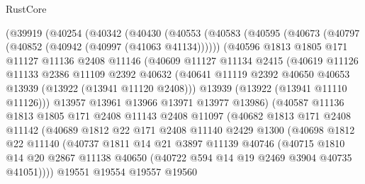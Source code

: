 \begin{lexlean}{RustCore}
\begin{coremodule}
    (@39919
      (@40254
        (@40342
          (@40430
            (@40553
              (@40583
                (@40595
                  (@40673 (@40797 (@40852 (@40942 (@40997 (@41063 @41134))))))
                  (@40596
                    @1813
                    @1805
                    @171
                    @11127
                    @11136
                    @2408
                    @11146
                    (@40609
                      @11127
                      @11134
                      @2415
                      (@40619
                        @11126
                        @11133
                        @2386
                        @11109
                        @2392
                        @40632
                        (@40641 @11119 @2392 @40650 @40653 @13939 (@13922 (@13941 @11120 @2408)))
                        @13939
                        (@13922 (@13941 @11110 @11126)))
                      @13957
                      @13961
                      @13966
                      @13971
                      @13977
                      @13986)
                    (@40587
                      @11136
                      @1813
                      @1805
                      @171
                      @2408
                      @11143
                      @2408
                      @11097
                      (@40682
                        @1813
                        @171
                        @2408
                        @11142
                        (@40689
                          @1812
                          @22
                          @171
                          @2408
                          @11140
                          @2429
                          @1300
                          (@40698
                            @1812
                            @22
                            @11140
                            (@40737
                              @1811
                              @14
                              @21
                              @3897
                              @11139
                              @40746
                              (@40715
                                @1810
                                @14
                                @20
                                @2867
                                @11138
                                @40650
                                (@40722 @594 @14 @19 @2469 @3904 @40735 @41051))))
                          @19551
                          @19554
                          @19557
                          @19560

\end{coremodule}
\end{lexlean}
